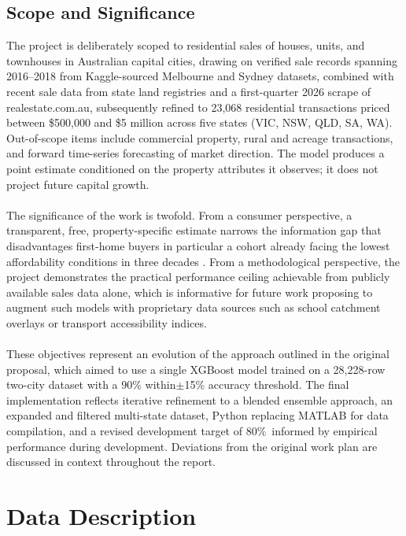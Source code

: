 \documentclass[a4paper,12pt]{article}
\begin{document}
\subsection{Scope and Significance}
The project is deliberately scoped to residential sales of houses, units, and townhouses in Australian capital cities, drawing on verified sale records spanning 2016–2018 from Kaggle-sourced Melbourne and Sydney datasets, combined with recent sale data from state land registries and a first-quarter 2026 scrape of realestate.com.au, subsequently refined to 23,068 residential transactions priced between \$500,000 and \$5 million across five states (VIC, NSW, QLD, SA, WA). Out-of-scope items include commercial property, rural and acreage transactions, and forward time-series forecasting of market direction. The model produces a point estimate conditioned on the property attributes it observes; it does not project future capital growth. 
\\
\\
The significance of the work is twofold. From a consumer perspective, a transparent, free, property-specific estimate narrows the information gap that disadvantages first-home buyers in particular a cohort already facing the lowest affordability conditions in three decades \cite{abs2024housing}. From a methodological perspective, the project demonstrates the practical performance ceiling achievable from publicly available sales data alone, which is informative for future work proposing to augment such models with proprietary data sources such as school catchment overlays or transport accessibility indices.
\\
\\
These objectives represent an evolution of the approach outlined in the original proposal, which aimed to use a single XGBoost model trained on a 28,228-row two-city dataset with a 90\% within$\pm$15\% accuracy threshold. The final implementation reflects iterative refinement to a blended ensemble approach, an expanded and filtered multi-state dataset, Python replacing MATLAB for data compilation, and a revised development target of 80\%\
informed by empirical performance during development. Deviations from the original work plan are discussed in context throughout the report.

\section{Data Description}
\end{document}
